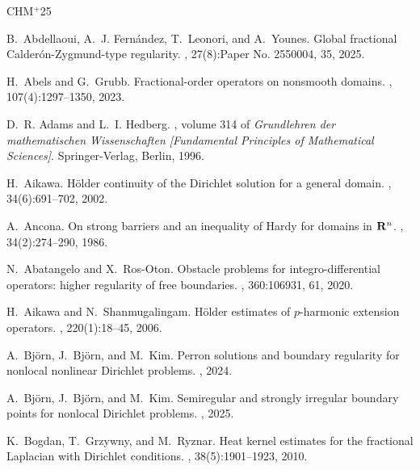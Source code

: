 \documentclass[11pt]{amsart}
\theoremstyle{plain}
\theoremstyle{definition}
\numberwithin{equation}{section}
\begin{document}
\newcommand{\etalchar}[1]{$^{#1}$}
\begin{thebibliography}{CHM{\etalchar{+}}25}

B.~Abdellaoui, A.~J. Fern\'andez, T.~Leonori, and A.~Younes.
\newblock Global fractional {C}alder\'on-{Z}ygmund-type regularity.
, 27(8):Paper No. 2550004, 35, 2025.

H.~Abels and G.~Grubb.
\newblock Fractional-order operators on nonsmooth domains.
, 107(4):1297--1350, 2023.

D.~R. Adams and L.~I. Hedberg.
, volume 314 of {\em
  Grundlehren der mathematischen Wissenschaften [Fundamental Principles of
  Mathematical Sciences]}.
\newblock Springer-Verlag, Berlin, 1996.

H.~Aikawa.
\newblock H\"older continuity of the {D}irichlet solution for a general domain.
, 34(6):691--702, 2002.

A.~Ancona.
\newblock On strong barriers and an inequality of {H}ardy for domains in {${\bf
  R}^n$}.
, 34(2):274--290, 1986.

N.~Abatangelo and X.~Ros-Oton.
\newblock Obstacle problems for integro-differential operators: higher
  regularity of free boundaries.
, 360:106931, 61, 2020.

H.~Aikawa and N.~Shanmugalingam.
\newblock H\"older estimates of {$p$}-harmonic extension operators.
, 220(1):18--45, 2006.

A.~Bj{\"o}rn, J.~Bj{\"o}rn, and M.~Kim.
\newblock Perron solutions and boundary regularity for nonlocal nonlinear
  {D}irichlet problems.
, 2024.

A.~Bj{\"o}rn, J.~Bj{\"o}rn, and M.~Kim.
\newblock Semiregular and strongly irregular boundary points for nonlocal
  {D}irichlet problems.
, 2025.

K.~Bogdan, T.~Grzywny, and M.~Ryznar.
\newblock Heat kernel estimates for the fractional {L}aplacian with {D}irichlet
  conditions.
, 38(5):1901--1923, 2010.


\end{thebibliography}
\end{document}
